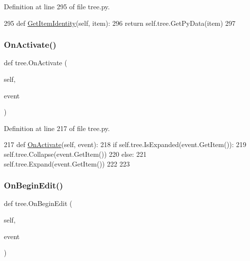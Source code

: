 Definition at line 295 of file tree.\+py.


\begin{DoxyCode}
295     \textcolor{keyword}{def }\hyperlink{namespacetree_a0aa735bae0dc8e20d0aecaba52fc2754}{GetItemIdentity}(self, item):
296         \textcolor{keywordflow}{return} self.tree.GetPyData(item)
297             
\end{DoxyCode}
\mbox{\label{namespacetree_a4e5bad86778717f20ed7754225b2d6f9}} 
\subsubsection{\texorpdfstring{On\+Activate()}{OnActivate()}}
{\footnotesize\ttfamily def tree.\+On\+Activate (\begin{DoxyParamCaption}\item[{}]{self,  }\item[{}]{event }\end{DoxyParamCaption})}



Definition at line 217 of file tree.\+py.


\begin{DoxyCode}
217     \textcolor{keyword}{def }\hyperlink{namespacetree_a4e5bad86778717f20ed7754225b2d6f9}{OnActivate}(self, event):
218         \textcolor{keywordflow}{if} self.tree.IsExpanded(event.GetItem()):
219             self.tree.Collapse(event.GetItem())
220         \textcolor{keywordflow}{else}:
221             self.tree.Expand(event.GetItem())
222 
223 
\end{DoxyCode}
\mbox{\label{namespacetree_a3dbf42d21efffc543db2f43647ed898f}} 
\subsubsection{\texorpdfstring{On\+Begin\+Edit()}{OnBeginEdit()}}
{\footnotesize\ttfamily def tree.\+On\+Begin\+Edit (\begin{DoxyParamCaption}\item[{}]{self,  }\item[{}]{event }\end{DoxyParamCaption})}



